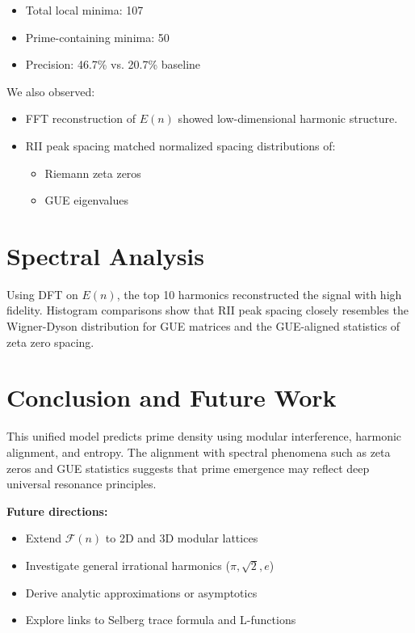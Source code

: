 \documentclass[12pt]{article}
\begin{document}
\begin{itemize}
\item Total local minima: 107
\item Prime-containing minima: 50
\item Precision: 46.7\% vs. 20.7\% baseline
\end{itemize}

We also observed:
\begin{itemize}
\item FFT reconstruction of \(E(n)\) showed low-dimensional harmonic structure.
\item RII peak spacing matched normalized spacing distributions of:
  \begin{itemize}
  \item Riemann zeta zeros
  \item GUE eigenvalues
  \end{itemize}
\end{itemize}

\section{Spectral Analysis}
Using DFT on \(E(n)\), the top 10 harmonics reconstructed the signal with high fidelity. Histogram comparisons show that RII peak spacing closely resembles the Wigner-Dyson distribution for GUE matrices and the GUE-aligned statistics of zeta zero spacing.

\section{Conclusion and Future Work}
This unified model predicts prime density using modular interference, harmonic alignment, and entropy. The alignment with spectral phenomena such as zeta zeros and GUE statistics suggests that prime emergence may reflect deep universal resonance principles.

\textbf{Future directions:}
\begin{itemize}
\item Extend \(\mathcal{F}(n)\) to 2D and 3D modular lattices
\item Investigate general irrational harmonics (\(\pi, \sqrt{2}, e\))
\item Derive analytic approximations or asymptotics
\item Explore links to Selberg trace formula and L-functions
\end{itemize}
\end{document}
